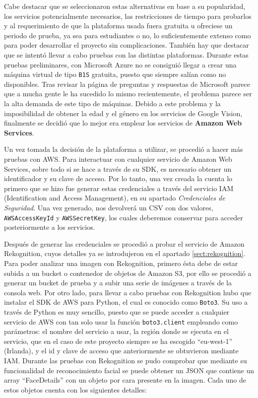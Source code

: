 Cabe destacar que se seleccionaron estas alternativas en base a su popularidad, los servicios potencialmente necesarios, las restricciones de tiempo para probarlos y al requerimiento de que la plataforma usada fuera gratuita u ofreciese un periodo de prueba, ya sea para estudiantes o no, lo suficientemente extenso como para poder desarrollar el proyecto sin complicaciones. También hay que destacar que se intentó llevar a cabo pruebas con las distintas plataformas. Durante estas pruebas preliminares, con Microsoft Azure no se consiguió llegar a crear una máquina virtual de tipo \texttt{B1S} gratuita, puesto que siempre salían como no disponibles. Tras revisar la página de preguntas y respuestas de Microsoft parece que a mucha gente le ha sucedido lo mismo recientemente, el problema parece ser la alta demanda de este tipo de máquinas. Debido a este problema y la imposibilidad de obtener la edad y el género en los servicios de Google Vision, finalmente se decidió que lo mejor era emplear los servicios de \textbf{Amazon Web Services}.

Un vez tomada la decisión de la plataforma a utilizar, se procedió a hacer más pruebas con AWS. Para interactuar con cualquier servicio de Amazon Web Services, sobre todo si se hace a través de su SDK, es necesario obtener un identificador y su clave de acceso. Por lo tanto, una vez creada la cuenta lo primero que se hizo fue generar estas credenciales a través del servicio IAM (Identification and Access Management), en su apartado \textit{Credenciales de Seguridad}. Una vez generado, nos devolverá un CSV con dos valores, \texttt{AWSAccessKeyId} y \texttt{AWSSecretKey}, los cuales deberemos conservar para acceder posteriormente a los servicios.

Después de generar las credenciales se procedió a probar el servicio de Amazon Rekognition, cuyos detalles ya se introdujeron en el apartado \ref{sect:rekognition}. Para poder analizar una imagen con Rekognition, primero ésta debe de estar subida a un bucket o contenedor de objetos de Amazon S3, por ello se procedió a generar un bucket de prueba y a subir una serie de imágenes a través de la consola web. Por otro lado, para llevar a cabo pruebas con Rekognition hubo que instalar el SDK de AWS para Python, el cual es conocido como \texttt{Boto3}. Su uso a través de Python es muy sencillo, puesto que se puede acceder a cualquier servicio de AWS con tan solo usar la función \texttt{boto3.client} empleando como parámetros: el nombre del servicio a usar, la región donde se ejecuta en el servicio, que en el caso de este proyecto siempre se ha escogido ``eu-west-1'' (Irlanda), y el id y clave de acceso que anteriormente se obtuvieron mediante IAM. Durante las pruebas con Rekognition se pudo comprobar que mediante su funcionalidad de reconocimiento facial se puede obtener un JSON que contiene un array ``FaceDetails'' con un objeto por cara presente en la imagen. Cada uno de estos objetos cuenta con los siguientes detalles:

